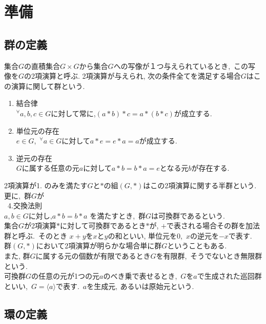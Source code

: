 \chapter{準備}
\section{群の定義} 
集合$G$の直積集合$G \times G$から集合$G$への写像が１つ与えられているとき,\ この写像を$G$の2項演算と呼ぶ. 2項演算が与えられ, 次の条件全てを満足する場合$G$はこの演算に関して群という.\
\begin{enumerate}
 \item 結合律\\
 ${}^{\forall}a,b,c \in G$に対して常に,$(a \ast b) \ast c=a \ast (b \ast c)$が成立する.
 \item 単位元の存在\\
 $e \in G$,\ ${}^{\forall}a \in G$に対して$a \ast e=e \ast a=a$が成立する.
 \item 逆元の存在\\ 
 $G$に属する任意の元$a$に対して$a \ast b=b \ast a=e$となる元$b$が存在する.
\end{enumerate} 
2項演算が1. のみを満たす$G$と$*$の組$(G, \ast )$はこの2項演算に関する半群という.\\
更に,\ 群$G$が\\
\quad \ 4.交換法則\\
$a,b \in G$に対し,$a \ast b=b \ast a$
を満たすとき,\ 群$G$は可換群であるという.\\


集合$G$が2項演算$\ast$に対して可換群であるとき$\ast$が, $+$で表される場合その群を加法群と呼ぶ.\ そのとき $x+y$を$x$と$y$の和といい, 単位元を0,\ $x$の逆元を$-x$で表す.\\
群$(G,\ast)$において2項演算が明らかな場合単に群$G$ということもある.\\
また, 群$G$に属する元の個数が有限であるとき$G$を有限群,\ そうでないとき無限群という.\\


可換群$G$の任意の元が1つの元$a$のべき乗で表せるとき,\ $G$を$a$で生成された巡回群といい,\ 
$G=\langle a \rangle$で表す.\ $aを生成元,\ あるいは原始元という.\ $
\newpage
\section{環の定義}
